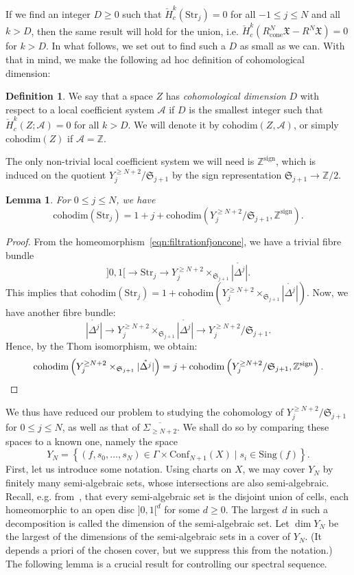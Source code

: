 \documentclass[a4paper]{amsart}
\newcommand{\bZ}{\mathbb Z}
\newcommand{\cA}{\mathcal A}
\newcommand{\fX}{\mathfrak X}
\newcommand{\lra}{\longrightarrow}
\newcommand{\fS}{\mathfrak S}
\theoremstyle{plain}
\newtheorem{lemma}[theorem]{Lemma}
\theoremstyle{definition}
\newtheorem{definition}[theorem]{Definition}
\newcommand{\CCH}{\check{H}_{c}}
\newcommand{\Conf}{\mathrm{Conf}}
\newcommand{\Str}{\mathrm{Str}}
\newcommand{\cohodim}{\mathrm{cohodim}}
\begin{document}
If we find an integer $D \geq 0$ such that $\CCH^k(\Str_j) = 0$ for all $-1 \leq j \leq N$ and all $k > D$, then the same result will hold for the union, i.e. $\CCH^k(R^N_\text{cone}\fX - R^N\fX) = 0$ for $k > D$. In what follows, we set out to find such a $D$ as small as we can. With that in mind, we make the following ad hoc definition of cohomological dimension: 
\begin{definition}
We say that a space $Z$ has \emph{cohomological dimension} $D$ with respect to a local coefficient system $\cA$ if $D$ is the smallest integer such that $\CCH^k(Z; \cA) = 0$ for all $k > D$. We will denote it by $\cohodim(Z, \cA)$, or simply $\cohodim(Z)$ if $\cA = \bZ$.
\end{definition}




The only non-trivial local coefficient system we will need is $\bZ^\mathrm{sign}$, which is induced on the quotient $Y_j^{\geq N+2} / \fS_{j+1}$ by the sign representation $\fS_{j+1} \to \bZ/2$.
\begin{lemma}\label{lemma:firstestimationFilj}
For $0 \leq j \leq N$, we have 
\[
    \cohodim(\Str_j) = 1+j+ \cohodim\left(Y_j^{\geq N+2} / \fS_{j+1}, \bZ^\mathrm{sign}\right).
\]
\end{lemma}
\begin{proof}
From the homeomorphism~\eqref{eqn:filtrationfjoncone}, we have a trivial fibre bundle
\[
    ]0,1[ \lra \Str_j \lra Y_j^{\geq N+2} \times_{\fS_{j+1}} \mathring{|\Delta^j|}.
\]
This implies that $\cohodim(\Str_j) = 1 + \cohodim\left(Y_j^{\geq N+2} \times_{\fS_{j+1}} \mathring{|\Delta^j|}\right)$.
Now, we have another fibre bundle:
\[
    \mathring{|\Delta^j|} \lra Y_j^{\geq N+2} \times_{\fS_{j+1}} \mathring{|\Delta^j|} \lra Y_j^{\geq N+2} / \fS_{j+1}.
\]
Hence, by the Thom isomorphism, we obtain:
\[
    \cohodim\left(Y_j^{\geq N+2} \times_{\fS_{j+1}} \mathring{|\Delta^j|}\right) = j + \cohodim\left(Y_j^{\geq N+2} / \fS_{j+1}, \bZ^\mathrm{sign}\right).\qedhere
\]
\end{proof}

We thus have reduced our problem to studying the cohomology of $Y_j^{\geq N+2} / \fS_{j+1}$ for $0 \leq j \leq N$, as well as that of $\overline{\Sigma_{\geq N+2}}$. We shall do so by comparing these spaces to a known one, namely the space
\[
    Y_N = \left\{ (f,s_0, \ldots, s_N) \in \Gamma \times \Conf_{N+1}(X) \mid s_i \in \mathrm{Sing}(f) \right\}.
\]
First, let us introduce some notation. Using charts on $X$, we may cover $Y_N$ by finitely many semi-algebraic sets, whose intersections are also semi-algebraic. Recall, e.g. from~\cite[Theorem 2.3.6]{bochnak_real_1998}, that every semi-algebraic set is the disjoint union of cells, each homeomorphic to an open disc $]0,1[^d$ for some $d \geq 0$. The largest $d$ in such a decomposition is called the dimension of the semi-algebraic set. Let $\dim Y_N$ be the largest of the dimensions of the semi-algebraic sets in a cover of $Y_N$. (It depends a priori of the chosen cover, but we suppress this from the notation.) The following lemma is a crucial result for controlling our spectral sequence.
\end{document}
